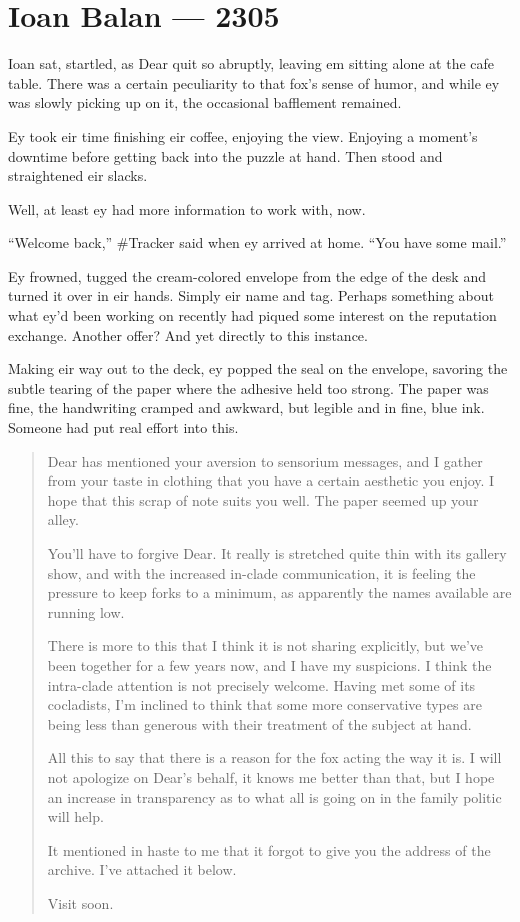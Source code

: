 \hypertarget{ioan-balan-2305}{%
\chapter*{Ioan Balan — 2305}\label{ioan-balan-2305}}

Ioan sat, startled, as Dear quit so abruptly, leaving em sitting alone at the cafe table. There was a certain peculiarity to that fox's sense of humor, and while ey was slowly picking up on it, the occasional bafflement remained.

Ey took eir time finishing eir coffee, enjoying the view. Enjoying a moment's downtime before getting back into the puzzle at hand. Then stood and straightened eir slacks.

Well, at least ey had more information to work with, now.

``Welcome back,'' \#Tracker said when ey arrived at home. ``You have some mail.''

Ey frowned, tugged the cream-colored envelope from the edge of the desk and turned it over in eir hands. Simply eir name and tag. Perhaps something about what ey'd been working on recently had piqued some interest on the reputation exchange. Another offer? And yet directly to this instance.

Making eir way out to the deck, ey popped the seal on the envelope, savoring the subtle tearing of the paper where the adhesive held too strong. The paper was fine, the handwriting cramped and awkward, but legible and in fine, blue ink. Someone had put real effort into this.

\begin{quote}
Dear has mentioned your aversion to sensorium messages, and I gather from your taste in clothing that you have a certain aesthetic you enjoy. I hope that this scrap of note suits you well. The paper seemed up your alley.

You'll have to forgive Dear. It really is stretched quite thin with its gallery show, and with the increased in-clade communication, it is feeling the pressure to keep forks to a minimum, as apparently the names available are running low.

There is more to this that I think it is not sharing explicitly, but we've been together for a few years now, and I have my suspicions. I think the intra-clade attention is not precisely welcome. Having met some of its cocladists, I'm inclined to think that some more conservative types are being less than generous with their treatment of the subject at hand.

All this to say that there is a reason for the fox acting the way it is. I will not apologize on Dear's behalf, it knows me better than that, but I hope an increase in transparency as to what all is going on in the family politic will help.

It mentioned in haste to me that it forgot to give you the address of the archive. I've attached it below.

Visit soon.
\end{quote}

